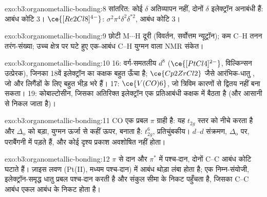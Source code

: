 \begin{solution}{exo:b3:organometallic-bonding:8}
सांतरित: कोई $\delta$ अतिव्यापन नहीं, दोनों $\delta$ इलेक्ट्रॉन अनाबंधी हैं: आबंध कोटि 3। $\ce{[Re2Cl8]^{4-}}$:
$\sigma^2\pi^4\delta^2\delta^{\ast2}$, आबंध कोटि 3।
\end{solution}

\begin{solution}{exo:b3:organometallic-bonding:9}
छोटी M$\cdots$H दूरी (विवर्तन, सर्वोत्तम न्यूट्रॉन); कम C--H तनन
तरंग-संख्या; उच्च क्षेत्र पर घटे हुए एक-आबंध C--H युग्मन वाला NMR संकेत।
\end{solution}

\begin{solution}{exo:b3:organometallic-bonding:10}
16: वर्ग-समतलीय $d^8$ ($\ce{[PtCl4]^{2-}}$, विल्किन्सन उत्प्रेरक), जिनका 18वें इलेक्ट्रॉन का कक्षक
बहुत ऊँचा है; $\ce{Cp2ZrCl2}$ जैसे आरंभिक-धातु , जो और
लिगैंडों के लिए बहुत भीड़ भरे हैं। 17: $\ce{V(CO)6}$, जो त्रिविम कारणों से द्वितय नहीं बना सकता। 19: कोबाल्टोसीन,
जिसका अतिरिक्त इलेक्ट्रॉन एक प्रतिआबंधी कक्षक में बैठता है (और आसानी से निकल जाता है)।
\end{solution}

\begin{solution}{exo:b3:organometallic-bonding:11}
CO एक प्रबल $\pi$ ग्राही है: यह $t_{2g}$ स्तर को नीचे करता है और $\Delta_{\mathrm o}$ को बड़ा, युग्मन ऊर्जा से
कहीं ऊपर, बनाता है: $t_{2g}^6$, प्रतिचुंबकीय। $d$--$d$ संक्रमण, $\Delta_{\mathrm o}$ पर, पराबैंगनी में पड़ते हैं,
और कोई दृश्य प्रकाश अवशोषित नहीं होता।
\end{solution}

\begin{solution}{exo:b3:organometallic-bonding:12}
$\pi$ से दान और $\pi^*$ में पश्च-दान, दोनों C--C आबंध कोटि घटाते हैं। ज़ाइस
लवण (Pt(II), मध्यम पश्च-दान) में आबंध थोड़ा लंबा होता है; एक निम्न-संयोजी,
इलेक्ट्रॉन-समृद्ध धातु प्रबल पश्च-दान करती है और संकुल
 सीमा के निकट पहुँचता है, जिसका C--C आबंध एकल आबंध के निकट होता है।
\end{solution}

